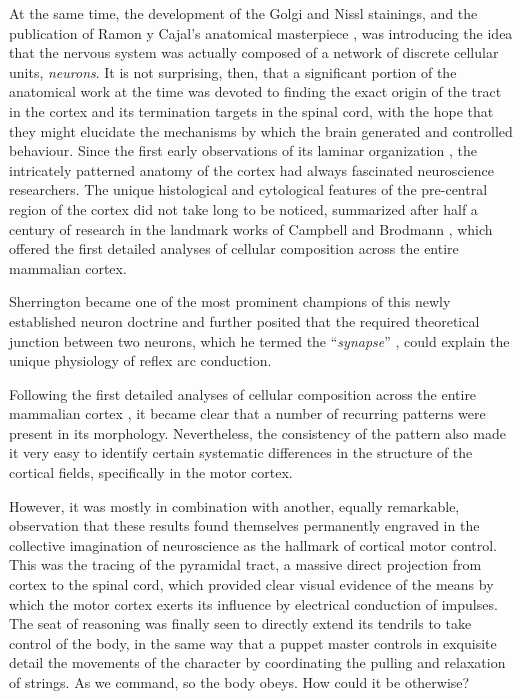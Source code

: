 At the same time, the development of the Golgi and Nissl stainings, and the publication of Ramon y Cajal's anatomical masterpiece \cite{RamonYCajal1894}, was introducing the idea that the nervous system was actually composed of a network of discrete cellular units, \emph{neurons}. It is not surprising, then, that a significant portion of the anatomical work at the time was devoted to finding the exact origin of the tract in the cortex and its termination targets in the spinal cord, with the hope that they might elucidate the mechanisms by which the brain generated and controlled behaviour. Since the first early observations of its laminar organization \cite{Baillarger1840}, the intricately patterned anatomy of the cortex had always fascinated neuroscience researchers.  The unique histological and cytological features of the pre-central region of the cortex did not take long to be noticed, summarized after half a century of research in the landmark works of Campbell and Brodmann \cite{Campbell1905,Brodmann1909}, which offered the first detailed analyses of cellular composition across the entire mammalian cortex.


Sherrington became one of the most prominent champions of this newly established neuron doctrine and further posited that the required theoretical junction between two neurons, which he termed the ``\emph{synapse}'' \cite{Foster1897}, could explain the unique physiology of reflex arc conduction.

Following the first detailed analyses of cellular composition across the entire mammalian cortex \cite{Campbell1905,Brodmann1909}, it became clear that a number of recurring patterns were present in its morphology. Nevertheless, the consistency of the pattern also made it very easy to identify certain systematic differences in the structure of the cortical fields, specifically in the motor cortex.

However, it was mostly in combination with another, equally remarkable, observation that these results found themselves permanently engraved in the collective imagination of neuroscience as the hallmark of cortical motor control. This was the tracing of the pyramidal tract, a massive direct projection from cortex to the spinal cord, which provided clear visual evidence of the means by which the motor cortex exerts its influence by electrical conduction of impulses. The seat of reasoning was finally seen to directly extend its tendrils to take control of the body, in the same way that a puppet master controls in exquisite detail the movements of the character by coordinating the pulling and relaxation of strings. As we command, so the body obeys. How could it be otherwise?

